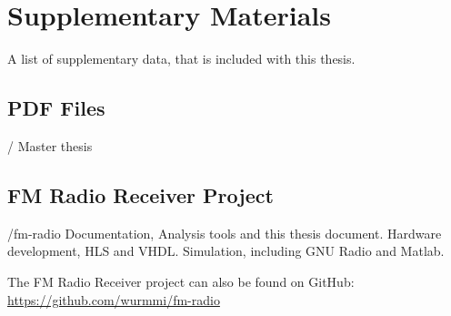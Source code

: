 \chapter{Supplementary Materials}
\label{app:materials}


A list of supplementary data, that is included with this thesis.

\section{PDF Files}
\begin{FileList}{/}
 Master thesis
\end{FileList}

\section{FM Radio Receiver Project}
\begin{FileList}{/fm-radio}
 Documentation, Analysis tools and this thesis document.
 Hardware development, HLS and VHDL.
 Simulation, including GNU Radio and Matlab.
\end{FileList}

\vspace{5 mm}
\noindent
The FM Radio Receiver project can also be found on GitHub:\\
\url{https://github.com/wurmmi/fm-radio}


